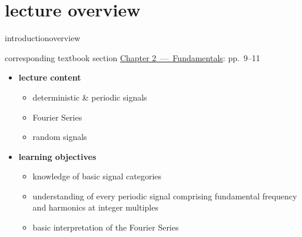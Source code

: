 




\subtitle{Module 2.1: Fundamentals~---~Sampling}


	

    \section[overview]{lecture overview}
        \begin{frame}{introduction}{overview}
            \begin{block}{corresponding textbook section}
                    \href{http://ieeexplore.ieee.org/xpl/articleDetails.jsp?tp=&arnumber=6331119&}{Chapter 2~---~Fundamentals}: pp.~9--11
            \end{block}

            \begin{itemize}
                \item   \textbf{lecture content}
                    \begin{itemize}
                        \item   deterministic \& periodic signals
                        \item   Fourier Series
                        \item   random signals
                    \end{itemize}
                \bigskip
                \item<2->   \textbf{learning objectives}
                    \begin{itemize}
                        \item   knowledge of basic signal categories
                        \item   understanding of every periodic signal comprising fundamental frequency and harmonics at integer multiples
                        \item   basic interpretation of the Fourier Series
                    \end{itemize}
            \end{itemize}
        \end{frame}
        
